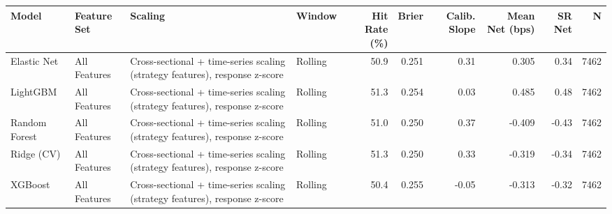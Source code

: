 \begin{tabular}{llllrrrrrr}
\toprule
Model & Feature Set & Scaling & Window & Hit Rate (\%) & Brier & Calib. Slope & Mean Net (bps) & SR Net & N \\
\midrule
Elastic Net & All Features & Cross-sectional + time-series scaling (strategy features), response z-score & Rolling & 50.9 & 0.251 & 0.31 & 0.305 & 0.34 & 7462 \\
LightGBM & All Features & Cross-sectional + time-series scaling (strategy features), response z-score & Rolling & 51.3 & 0.254 & 0.03 & 0.485 & 0.48 & 7462 \\
Random Forest & All Features & Cross-sectional + time-series scaling (strategy features), response z-score & Rolling & 51.0 & 0.250 & 0.37 & -0.409 & -0.43 & 7462 \\
Ridge (CV) & All Features & Cross-sectional + time-series scaling (strategy features), response z-score & Rolling & 51.3 & 0.250 & 0.33 & -0.319 & -0.34 & 7462 \\
XGBoost & All Features & Cross-sectional + time-series scaling (strategy features), response z-score & Rolling & 50.4 & 0.255 & -0.05 & -0.313 & -0.32 & 7462 \\
\bottomrule
\end{tabular}
